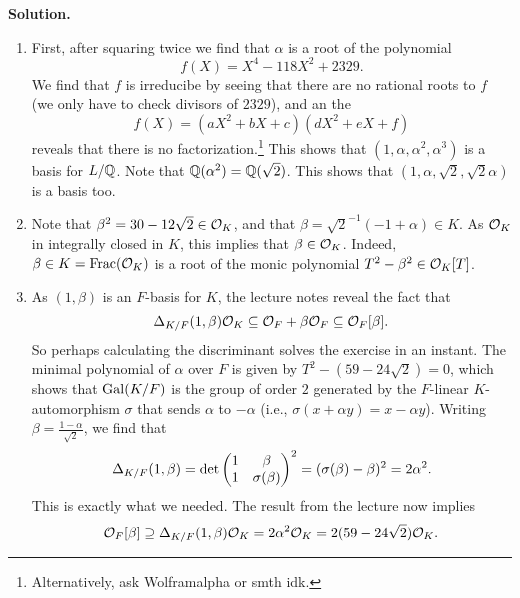 \documentclass[a4paper,11pt]{article}
\begin{document}
\textbf{Solution.}
\begin{enumerate}
    \item First, after squaring twice we find that $\alpha$ is a root of the
        polynomial
        \begin{equation*}
            f(X) = X^4 - 118X^2 + 2329.
        \end{equation*}
        We find that $f$ is irreducibe by seeing that there are no rational roots to $f$
        (we only have to check divisors of $2329$), and an the
        \begin{equation*}
            f(X) = (aX^2 + bX + c)(dX^2 + eX + f)
        \end{equation*}
        reveals that there is no factorization.\footnote{Alternatively, ask Wolframalpha
        or smth idk.} This shows that 
        $(1, \alpha, \alpha^2, \alpha^3)$ is a basis for $L/\mathbb{Q}$. Note that
        $\mathbb{Q}(\alpha^2) = \mathbb{Q}(\sqrt 2)$. This shows that $(1, \alpha, \sqrt 2, \sqrt 2 \alpha)$
        is a basis too.
    \item Note that $\beta^2 = 30 - 12\sqrt 2 \in \mathcal{O}_K$, and that $\beta = \sqrt 2^{-1}
        (-1 + \alpha) \in K$. As $\mathcal{O}_K$ in integrally closed in $K$, this implies that 
        $\beta \in \mathcal{O}_K$. Indeed, $\beta \in K = \mathrm{Frac} (\mathcal{O}_K)$ is a root of the monic
        polynomial $T^2 - \beta^2 \in \mathcal{O}_K[T]$.
    \item As $(1, \beta)$ is an $F$-basis for $K$, the lecture notes reveal the
        fact that $$\Delta_{K/F}(1, \beta) \mathcal{O}_K \subseteq \mathcal{O}_F + \beta \mathcal{O}_F
        \subseteq \mathcal{O}_F[\beta].$$ So perhaps calculating
        the discriminant solves the exercise in an instant. 
        The minimal polynomial of $\alpha$ over $F$ is given by $T^2 - (59 -
        24\sqrt 2) = 0$, which shows that $\operatorname{Gal}(K/F)$ is the group of order $2$
        generated by the $F$-linear $K$-automorphism $\sigma$ that sends $\alpha$ to 
        $-\alpha$ (i.e., $\sigma(x + \alpha y) = x - \alpha y$). Writing $\beta = \frac {1 - \alpha}{\sqrt 2}$, we find that 
        \begin{equation*}
            \Delta_{K/F}(1, \beta) = \det \begin{pmatrix} 1 & \beta\\ 1 & \sigma(\beta) \end{pmatrix}^2
            = (\sigma(\beta) - \beta)^2 = 2 \alpha^2.
        \end{equation*}
        This is exactly what we needed. The result from the lecture now implies
        \begin{equation*}
            \mathcal{O}_F[\beta] \supseteq \Delta_{K/F}(1, \beta) \mathcal{O}_K
            = 2 \alpha^2 \mathcal{O}_K = 2(59 - 24\sqrt 2) \mathcal{O}_K.
        \end{equation*}

        
\end{enumerate}


\contactend
\end{document}
